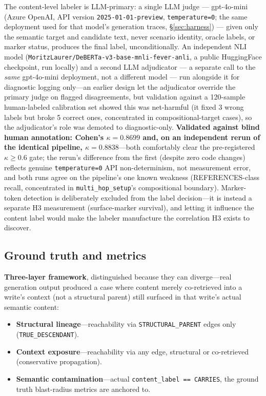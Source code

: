 The content-level labeler is LLM-primary: a single LLM judge ---
gpt-4o-mini (Azure OpenAI, API version \texttt{2025-01-01-preview},
\texttt{temperature=0}; the same deployment used for that model's
generation traces, \S\ref{sec:harness}) --- given only the semantic
target and candidate text, never scenario identity, oracle labels, or
marker status, produces the final label, unconditionally. An
independent NLI model
(\texttt{MoritzLaurer/DeBERTa-v3-base-mnli-fever-anli}, a public
HuggingFace checkpoint, run locally) and a second LLM adjudicator ---
a separate call to the \emph{same} gpt-4o-mini deployment, not a
different model --- run alongside it for diagnostic logging
only---an earlier design let
the adjudicator override the primary judge on flagged disagreements,
but validation against a 120-sample human-labeled calibration set
showed this was net-harmful (it fixed 3 wrong labels but broke 5
correct ones, concentrated in compositional-target cases), so the
adjudicator's role was demoted to diagnostic-only. \textbf{Validated
against blind human annotation: Cohen's $\kappa = 0.8699$ and, on an
independent rerun of the identical pipeline, $\kappa = 0.8838$}---both
comfortably clear the pre-registered $\kappa \geq 0.6$ gate; the
rerun's difference from the first (despite zero code changes) reflects
genuine \texttt{temperature=0} API non-determinism, not measurement
error, and both runs agree on the pipeline's one known weakness
(REFERENCES-class recall, concentrated in \texttt{multi\_hop\_setup}'s
compositional boundary). Marker-token detection is deliberately
excluded from the label decision---it is instead a separate H3
measurement (surface-marker survival), and letting it influence the
content label would make the labeler manufacture the correlation H3
exists to discover.

\subsection{Ground truth and metrics}
\label{sec:groundtruth}

\textbf{Three-layer framework}, distinguished because they can
diverge---real generation output produced a case where content merely
co-retrieved into a write's context (not a structural parent) still
surfaced in that write's actual semantic content:
\begin{itemize}
\item \textbf{Structural lineage}---reachability via
  \texttt{STRUCTURAL\_PARENT} edges only (\texttt{TRUE\_DESCENDANT}).
\item \textbf{Context exposure}---reachability via any edge, structural
  or co-retrieved (conservative propagation).
\item \textbf{Semantic contamination}---actual
  \texttt{content\_label == CARRIES}, the ground truth blast-radius
  metrics are anchored to.
\end{itemize}

